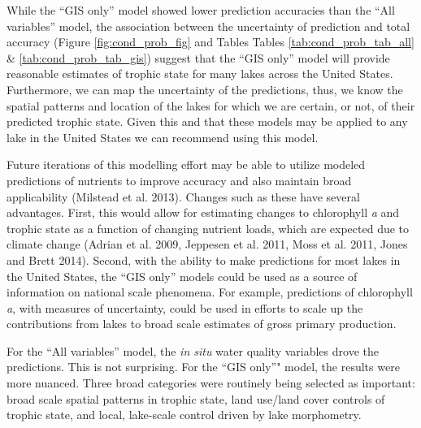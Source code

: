 \documentclass[12pt,]{article}
\begin{document}
While the ``GIS only'' model showed lower prediction accuracies than the
``All variables'' model, the association between the uncertainty of
prediction and total accuracy (Figure \ref{fig:cond_prob_fig} and Tables
Tables \ref{tab:cond_prob_tab_all} \& \ref{tab:cond_prob_tab_gis})
suggest that the ``GIS only'' model will provide reasonable estimates of
trophic state for many lakes across the United States. Furthermore, we
can map the uncertainty of the predictions, thus, we know the spatial
patterns and location of the lakes for which we are certain, or not, of
their predicted trophic state. Given this and that these models may be
applied to any lake in the United States we can recommend using this
model.

Future iterations of this modelling effort may be able to utilize
modeled predictions of nutrients to improve accuracy and also maintain
broad applicability (Milstead et al. 2013). Changes such as these have
several advantages. First, this would allow for estimating changes to
chlorophyll \emph{a} and trophic state as a function of changing
nutrient loads, which are expected due to climate change (Adrian et al.
2009, Jeppesen et al. 2011, Moss et al. 2011, Jones and Brett 2014).
Second, with the ability to make predictions for most lakes in the
United States, the ``GIS only'' models could be used as a source of
information on national scale phenomena. For example, predictions of
chlorophyll \emph{a}, with measures of uncertainty, could be used in
efforts to scale up the contributions from lakes to broad scale
estimates of gross primary production.

For the ``All variables'' model, the \emph{in situ} water quality
variables drove the predictions. This is not surprising. For the ``GIS
only''" model, the results were more nuanced. Three broad categories
were routinely being selected as important: broad scale spatial patterns
in trophic state, land use/land cover controls of trophic state, and
local, lake-scale control driven by lake morphometry.
\end{document}
